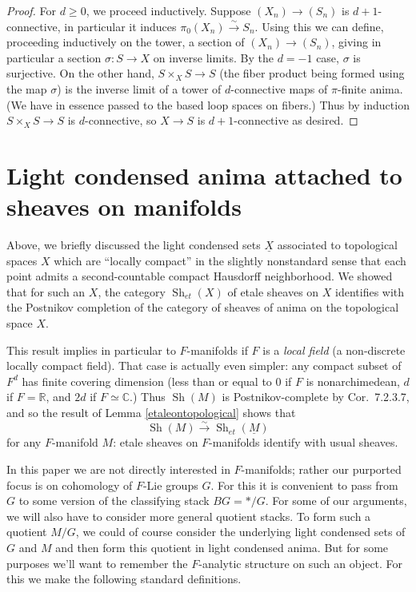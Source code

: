 \documentclass[12pt]{article}
\newcommand{\on}{\operatorname}
\begin{document}
\begin{proof}
For $d\geq 0$, we proceed inductively.  Suppose $(X_n)\rightarrow (S_n)$ is $d+1$-connective, in particular it induces $\pi_0(X_n)\overset{\sim}{\rightarrow}S_n$.  Using this we can define, proceeding inductively on the tower, a section of $(X_n)\rightarrow (S_n)$, giving in particular a section $\sigma:S\rightarrow X$ on inverse limits.  By the $d=-1$ case, $\sigma$ is surjective.  On the other hand, $S\times_X S\rightarrow S$ (the fiber product being formed using the map $\sigma$) is the inverse limit of a tower of $d$-connective maps of $\pi$-finite anima.  (We have in essence passed to the based loop spaces on fibers.)  Thus by induction $S\times_X S\rightarrow S$ is $d$-connective, so $X\rightarrow S$ is $d+1$-connective as desired.
\end{proof}


\section{Light condensed anima attached to sheaves on manifolds}\label{condmansec}

Above, we briefly discussed the light condensed sets $\underline{X}$ associated to topological spaces $X$ which are ``locally compact'' in the slightly nonstandard sense that each point admits a second-countable compact Hausdorff neighborhood.  We showed that for such an $X$, the category $\on{Sh}_{et}(X)$ of etale sheaves on $X$ identifies with the Postnikov completion of the category of sheaves of anima on the topological space $X$.

This result implies in particular to $F$-manifolds if $F$ is a \emph{local field} (a non-discrete locally compact field).  That case is actually even simpler: any compact subset of $F^d$ has finite covering dimension (less than or equal to $0$ if $F$ is nonarchimedean, $d$ if $F=\mathbb{R}$, and $2d$ if $F\simeq\mathbb{C}$.)  Thus $\on{Sh}(M)$ is Postnikov-complete by \cite{LurieHTT} Cor.\ 7.2.3.7, and so the result of Lemma \ref{etaleontopological} shows that
$$\on{Sh}(M)\overset{\sim}{\rightarrow}\on{Sh}_{et}(\underline{M})$$
for any $F$-manifold $M$: etale sheaves on $F$-manifolds identify with usual sheaves.

In this paper we are not directly interested in $F$-manifolds; rather our purported focus is on cohomology of $F$-Lie groups $G$.  For this it is convenient to pass from $G$ to some version of the classifying stack $BG=\ast/G$.  For some of our arguments, we will also have to consider more general quotient stacks.  To form such a quotient $M/G$, we could of course consider the underlying light condensed sets of $G$ and $M$ and then form this quotient in light condensed anima.  But for some purposes we'll want to remember the $F$-analytic structure on such an object.  For this we make the following standard definitions.
\end{document}
